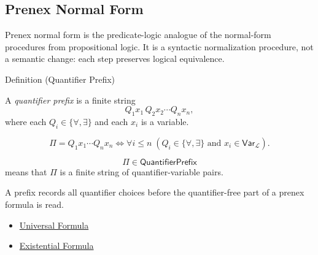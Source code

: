 
\subsection*{Prenex Normal Form}

\begin{remark*}
Prenex normal form is the predicate-logic analogue of the normal-form
procedures from propositional logic. It is a syntactic normalization procedure,
not a semantic change: each step preserves logical equivalence.
\end{remark*}

\begin{definitionbox}{Definition (Quantifier Prefix)}
\begin{definition}
\label{def:quantifier-prefix}
A \emph{quantifier prefix} is a finite string
\[
Q_1x_1\,Q_2x_2\cdots Q_nx_n,
\]
where each \(Q_i\in\{\forall,\exists\}\) and each \(x_i\) is a variable.
\end{definition}
\end{definitionbox}

\begin{remark*}
\[
\Pi=Q_1x_1\cdots Q_nx_n
\Longleftrightarrow
\forall i\leq n\;(Q_i\in\{\forall,\exists\}\text{ and }x_i\in\mathsf{Var}_{\mathcal L}).
\]
\end{remark*}

\begin{remark*}
\[
  \Pi\in\mathsf{QuantifierPrefix}
\] means that \(\Pi\) is a finite string
of quantifier-variable pairs.
\end{remark*}

\begin{remark*}[Interpretation]
A prefix records all quantifier choices before the quantifier-free part of a
prenex formula is read.
\end{remark*}

\begin{dependencies}
\begin{itemize}
  \item \hyperref[def:universal-q]{Universal Formula}
  \item \hyperref[def:existential-q]{Existential Formula}
\end{itemize}
\end{dependencies}

